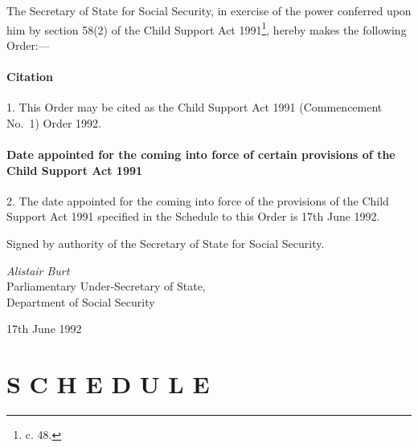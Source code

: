 \documentclass[a4paper,12pt]{article}
\title{\regstitle}
\author{S.I. 1992 No. 1431 (C.48)}
\date{Made 17th June 1992}
\begin{document}
\maketitle

\noindent
The Secretary of State for Social Security, in exercise of the power conferred upon him by section 58(2) of the Child Support Act 1991\footnote{ c. 48.}, hereby makes the following Order:—

{\sloppy

\tableofcontents

}

\setcounter{secnumdepth}{-2}

\subsection[1. Citation]{Citation}

1.  This Order may be cited as the Child Support Act 1991 (Commencement No.\ 1) Order 1992.

\subsection[2. Date appointed for the coming into force of certain provisions of the Child Support Act 1991]{Date appointed for the coming into force of certain provisions of the Child Support Act 1991}

2.  The date appointed for the coming into force of the provisions of the Child Support Act 1991 specified in the Schedule to this Order is 17th June 1992.

\bigskip

Signed by authority of the Secretary of State for Social Security.

{\raggedleft
\emph{Alistair Burt}\\Parliamentary Under-Secretary of State,\\Department of Social Security

}

17th June 1992

\small

\part[Schedule]{S C H E D U L E}
\end{document}
